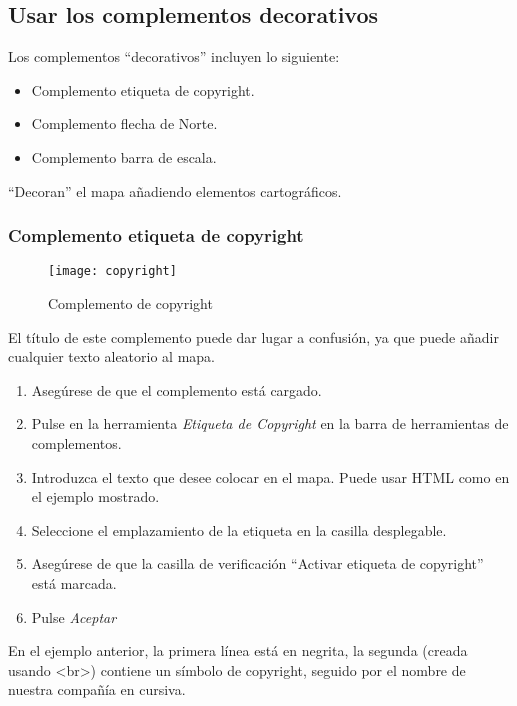 \subsection{Usar los complementos decorativos}

Los complementos ``decorativos'' incluyen lo siguiente:

\begin{itemize}
\item Complemento etiqueta de copyright.
\item Complemento flecha de Norte.
\item Complemento barra de escala.
\end{itemize}
 
``Decoran'' el mapa añadiendo elementos cartográficos.

\subsubsection{Complemento etiqueta de copyright}

\begin{figure}[ht]
   \begin{center}
   \caption{Complemento de copyright}\label{fig:copyright}\smallskip
   \texttt{[image: copyright]}
\end{center}  
\end{figure}

El título de este complemento puede dar lugar a confusión, ya que puede añadir cualquier texto aleatorio al mapa.

\begin{enumerate}
\item Asegúrese de que el complemento está cargado.
\item Pulse en la herramienta \textsl{Etiqueta de Copyright} en la barra de herramientas de complementos.
\item Introduzca el texto que desee colocar en el mapa. Puede usar HTML como en el ejemplo mostrado.
\item Seleccione el emplazamiento de la etiqueta en la casilla desplegable.
\item Asegúrese de que la casilla de verificación ``Activar etiqueta de copyright'' está marcada.
\item Pulse \textsl{Aceptar}
\end{enumerate}

En el ejemplo anterior, la primera línea está en negrita, la segunda (creada usando \textless br\textgreater) contiene un símbolo de copyright, seguido por el nombre de nuestra compañía en cursiva.

